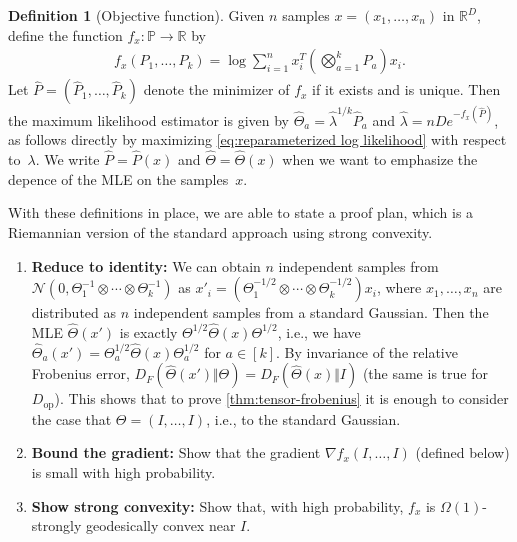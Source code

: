 \documentclass[aos]{imsart}
\theoremstyle{definition}
\newtheorem{definition}[theorem]{Definition}
\numberwithin{equation}{section}
\DeclareMathOperator{\op}{op}
\newcommand{\R}{{\mathbb{R}}}
\renewcommand{\P}{{\mathbb{P}}}
\newcommand{\ot}{\otimes}
\newcommand{\cN}{\mathcal{N}}
\newcommand{\samp}{x}
\begin{document}
\begin{definition}[Objective function]\label{dfn:function}
Given $n$ samples $x = (x_1,\dots,x_n)$ in $\R^D$, define the function $f_x \colon \P \to \R$ by
\begin{align*}
  f_x(P_1,\dots,P_k)
= \log \sum_{i=1}^n x_i^T \left( \textstyle \bigotimes_{a=1}^k P_a \right) \samp_i.
\end{align*}
Let $\widehat P = (\widehat P_1,\dots,\widehat P_k)$ denote the minimizer of $f_x$ if it exists and is unique.
Then the maximum likelihood estimator is given by $\widehat\Theta_a = {\hat\lambda}^{1/k} \widehat P_a$ and $\hat\lambda = nD e^{-f_x(\widehat P)}$, as follows directly by maximizing \cref{eq:reparameterized log likelihood} with respect to~$\lambda$.
We write $\widehat P = \widehat P(x)$ and $\widehat\Theta = \widehat\Theta(x)$ when we want to emphasize the depence of the MLE on the samples~$x$.
\end{definition}






With these definitions in place, we are able to state a proof plan, which is a Riemannian version of the standard approach using strong convexity.

\begin{enumerate}
\item\label{it:reduce}
\textbf{Reduce to identity:}
We can obtain $n$ independent samples from $\cN(0, \Theta_1^{-1} \ot \cdots \ot \Theta_k^{-1})$ as $x'_i = ( \Theta_1^{-1/2} \ot \cdots \ot \Theta_k^{-1/2} ) x_i$, where $x_1,\dots,x_n$ are distributed as $n$ independent samples from a standard Gaussian.
Then the MLE $\widehat{\Theta}(x')$ is exactly $\Theta^{1/2} \widehat{\Theta}(x) \Theta^{1/2}$, i.e., we have $\widehat\Theta_a(x') = \Theta_a^{1/2} \widehat\Theta(x) \Theta_a^{1/2}$ for $a\in[k]$.
By invariance of the relative Frobenius error, $D_F(\widehat\Theta(x') \Vert \Theta) = D_F(\widehat\Theta(x) \Vert I)$ (the same is true for $D_{\op}$).
This shows that to prove \cref{thm:tensor-frobenius} it is enough to consider the case that $\Theta = (I,\dots,I)$, i.e., to the standard Gaussian.
\item\label{it:grad} \textbf{Bound the gradient:}
Show that the gradient $\nabla f_x(I,\dots,I)$ (defined below) is small with high probability.
\item\label{it:convexity} \textbf{Show strong convexity:}
Show that, with high probability, $f_x$ is $\Omega(1)$-strongly geodesically convex near $I$.
\end{enumerate}
\end{document}
